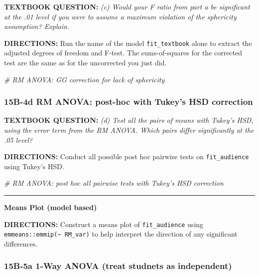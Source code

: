 \documentclass[
]{article}
\newenvironment{Shaded}{\begin{snugshade}}{\end{snugshade}}
\newcommand{\CommentTok}[1]{\textcolor[rgb]{0.56,0.35,0.01}{\textit{#1}}}
\begin{document}
\textbf{TEXTBOOK QUESTION:} \emph{(c) Would your F ratio from part a be
significant at the .01 level if you were to assume a maximum violation
of the sphericity assumption? Explain. }

\textbf{DIRECTIONS:} Run the name of the model \texttt{fit\_textbook}
alone to extract the adjusted degrees of freedom and F-test. The
sums-of-squares for the corrected test are the same as for the
uncorrected you just did.

\begin{Shaded}
\begin{Highlighting}[]
\CommentTok{# RM ANOVA: GG correction for lack of sphericity}
\end{Highlighting}
\end{Shaded}

\clearpage

\hypertarget{b-4d-rm-anova-post-hoc-with-tukeys-hsd-correction}{%
\subsubsection{15B-4d RM ANOVA: post-hoc with Tukey's HSD
correction}\label{b-4d-rm-anova-post-hoc-with-tukeys-hsd-correction}}

\textbf{TEXTBOOK QUESTION:} \emph{(d) Test all the pairs of means with
Tukey's HSD, using the error term from the RM ANOVA. Which pairs differ
significantly at the .05 level?}

\textbf{DIRECTIONS:} Conduct all possible post hoc pairwise tests on
\texttt{fit\_audience} using Tukey's HSD.

\begin{Shaded}
\begin{Highlighting}[]
\CommentTok{# RM ANOVA: post hoc all pairwise tests with Tukey's HSD correction}
\end{Highlighting}
\end{Shaded}

\begin{center}\rule{0.5\linewidth}{\linethickness}\end{center}

\textbf{Means Plot (model based)}

\textbf{DIRECTIONS:} Construct a means plot of \texttt{fit\_audience}
using \texttt{emmeans::emmip(\textasciitilde{}\ RM\_var)} to help
interpret the direction of any significant differences.

\clearpage

\hypertarget{b-5a-1-way-anova-treat-studnets-as-independent}{%
\subsubsection{15B-5a 1-Way ANOVA (treat studnets as
independent)}\label{b-5a-1-way-anova-treat-studnets-as-independent}}
\end{document}
